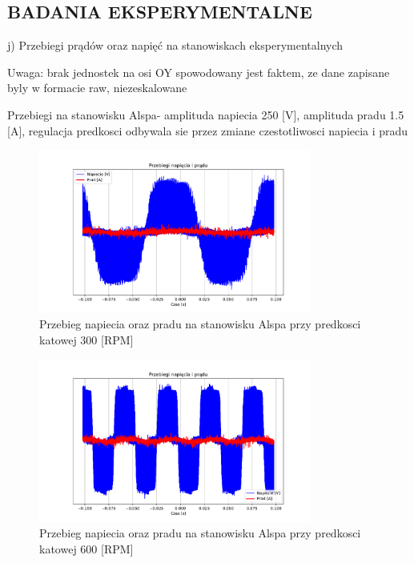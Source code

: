 \documentclass[11pt]{article}
\begin{document}
\subsection{BADANIA EKSPERYMENTALNE}

j) Przebiegi prądów oraz napięć na stanowiskach eksperymentalnych

Uwaga: brak jednostek na osi OY spowodowany jest faktem, ze dane
zapisane byly w formacie raw, niezeskalowane

Przebiegi na stanowisku Alspa- amplituda napiecia 250 [V], amplituda pradu 1.5 [A], regulacja predkosci odbywala sie przez zmiane czestotliwosci napiecia i pradu

\begin{figure}[H]
\centering
\includegraphics[width=0.8\textwidth]{aun1_alspa_rpm300.pdf}
\caption{Przebieg napiecia oraz pradu na stanowisku Alspa przy predkosci katowej 300 [RPM]}
\end{figure}

\begin{figure}[H]
\centering
\includegraphics[width=0.8\textwidth]{aun1_alspa_rpm600.pdf}
\caption{Przebieg napiecia oraz pradu na stanowisku Alspa przy predkosci katowej 600 [RPM]}
\end{figure}
\end{document}
